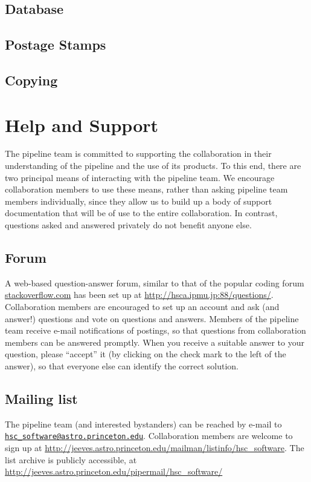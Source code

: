 \documentclass[12pt]{article}
\def\email#1{\href{mailto:#1}{\nolinkurl{#1}}}
\begin{document}
\subsection{Database}
\subsection{Postage Stamps}
\subsection{Copying}


\section{Help and Support}
\label{sec:support}

The pipeline team is committed to supporting the collaboration in their understanding of the pipeline and the
use of its products.  To this end, there are two principal means of interacting with the pipeline team.  We
encourage collaboration members to use these means, rather than asking pipeline team members individually,
since they allow us to build up a body of support documentation that will be of use to the entire
collaboration.  In contrast, questions asked and answered privately do not benefit anyone else.

\subsection{Forum}

A web-based question-answer forum, similar to that of the popular coding forum \url{stackoverflow.com} has
been set up at \url{http://hsca.ipmu.jp:88/questions/}.  Collaboration members are encouraged to set up an
account and ask (and answer!) questions and vote on questions and answers.  Members of the pipeline team
receive e-mail notifications of postings, so that questions from collaboration members can be answered
promptly.  When you receive a suitable answer to your question, please ``accept'' it (by clicking on the check
mark to the left of the answer), so that everyone else can identify the correct solution.

\subsection{Mailing list}

The pipeline team (and interested bystanders) can be reached by e-mail to
\email{hsc_software@astro.princeton.edu}.  Collaboration members are welcome to sign up at
\url{http://jeeves.astro.princeton.edu/mailman/listinfo/hsc_software}.  The list archive is publicly
accessible, at \url{http://jeeves.astro.princeton.edu/pipermail/hsc_software/}
\end{document}
